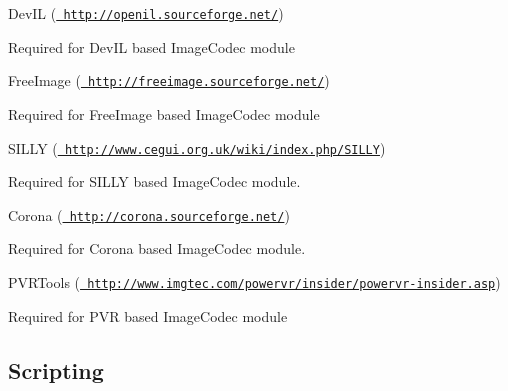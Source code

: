 \begin{DoxyItemize}
\item Dev\+IL (\href{http://openil.sourceforge.net/}{\texttt{ http\+://openil.\+sourceforge.\+net/}})
\begin{DoxyItemize}
\item Required for Dev\+IL based Image\+Codec module
\end{DoxyItemize}
\item Free\+Image (\href{http://freeimage.sourceforge.net/}{\texttt{ http\+://freeimage.\+sourceforge.\+net/}})
\begin{DoxyItemize}
\item Required for Free\+Image based Image\+Codec module
\end{DoxyItemize}
\item S\+I\+L\+LY (\href{http://www.cegui.org.uk/wiki/index.php/SILLY}{\texttt{ http\+://www.\+cegui.\+org.\+uk/wiki/index.\+php/\+S\+I\+L\+LY}})
\begin{DoxyItemize}
\item Required for S\+I\+L\+LY based Image\+Codec module.
\end{DoxyItemize}
\item Corona (\href{http://corona.sourceforge.net/}{\texttt{ http\+://corona.\+sourceforge.\+net/}})
\begin{DoxyItemize}
\item Required for Corona based Image\+Codec module.
\end{DoxyItemize}
\item P\+V\+R\+Tools (\href{http://www.imgtec.com/powervr/insider/powervr-insider.asp}{\texttt{ http\+://www.\+imgtec.\+com/powervr/insider/powervr-\/insider.\+asp}})
\begin{DoxyItemize}
\item Required for P\+VR based Image\+Codec module
\end{DoxyItemize}
\end{DoxyItemize}\hypertarget{dependencies_dependencies_scripting}{}\subsection{Scripting}\label{dependencies_dependencies_scripting}

